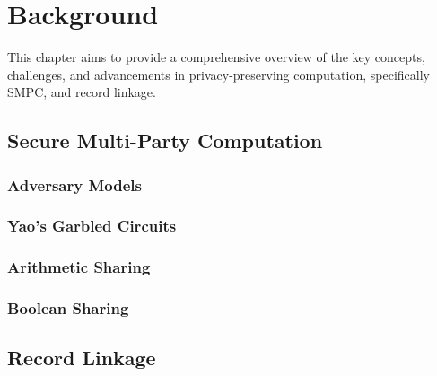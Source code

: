 \chapter{Background}\label{Background}
This chapter aims to provide a comprehensive overview of the key concepts, challenges, and advancements in privacy-preserving computation, specifically \ac{SMPC}, and record linkage.
\section{Secure Multi-Party Computation}

\subsection{Adversary Models}
\subsection{Yao's Garbled Circuits}
\subsection{Arithmetic Sharing}
\subsection{Boolean Sharing}
\section{Record Linkage}
